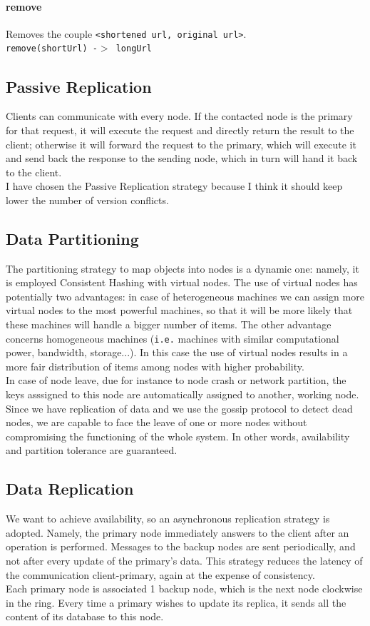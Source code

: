 \documentclass{article}
\begin{document}
\paragraph{remove}
Removes the couple \texttt{<shortened url, original url>}.\\
\texttt{remove(shortUrl) -$>$  longUrl}


\subsection{Passive Replication}
Clients can communicate with every node. If the contacted node is the primary for that request, it will execute the request and directly return the result to the client; otherwise it will forward the request to the primary, which will execute it and send back the response to the sending node, which in turn will hand it back to the client. \\

I have chosen the Passive Replication strategy because I think it should keep lower the number of version conflicts.

\subsection{Data Partitioning}
The partitioning strategy to map objects into nodes is a dynamic one: namely, it is employed Consistent Hashing with virtual nodes. The use of virtual nodes has potentially two advantages: in case of heterogeneous machines we can assign more virtual nodes to the most powerful machines, so that it will be more likely that these machines will handle a bigger number of items. The other advantage concerns homogeneous machines (\texttt{i.e.} machines with similar computational power, bandwidth, storage...). In this case the use of virtual nodes results in a more fair distribution of items among nodes with higher probability. \\ In case of node leave, due for instance to node crash or network partition, the keys asssigned to this node are automatically assigned to another, working node. Since we have replication of data and we use the gossip protocol to detect dead nodes, we are capable to face the leave of one or more nodes without compromising the functioning of the whole system. In other words, availability and partition tolerance are guaranteed.

\subsection{Data Replication}
We want to achieve availability, so an asynchronous replication strategy is adopted. Namely, the primary node immediately answers to the client after an operation is performed. Messages to the backup nodes are sent periodically, and not after every update of the primary's data. This strategy reduces the latency of the communication client-primary, again at the expense of consistency. \\
Each primary node is associated 1 backup node, which is the next node clockwise in the ring. Every time a primary wishes to update its replica, it sends all the content of its database to this node. 
\end{document}
